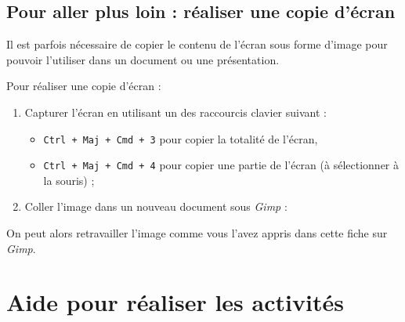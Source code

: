










\subsection{Pour aller plus loin : réaliser une copie d'écran}\label{CaptureEcran}

Il est parfois nécessaire de copier le contenu de l'écran sous forme d'image pour pouvoir l'utiliser dans un document ou une présentation.

\vspace{12pt}

Pour réaliser une copie d'écran :

\begin{enumerate}
\item Capturer l'écran en utilisant un des raccourcis clavier suivant :
        \begin{itemize}
        \item \texttt{Ctrl + Maj + Cmd + 3} pour copier la totalité de l'écran,
        \item \texttt{Ctrl + Maj + Cmd + 4} pour copier une partie de l'écran (à sélectionner à la souris) ;
        \end{itemize} 


\item Coller l'image dans un nouveau document sous \emph{Gimp} : 
\end{enumerate}


On peut alors retravailler l'image comme vous l'avez appris dans cette fiche sur \emph{Gimp}. 


\section{Aide pour réaliser les activités}

